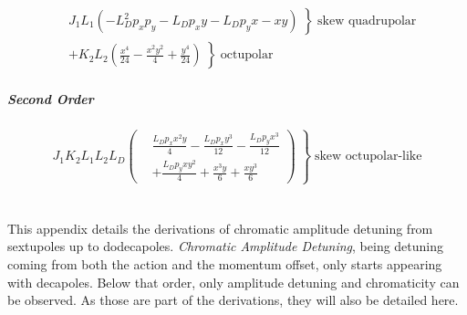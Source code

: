 \begin{equation}
  \begin{aligned}
    &\left. J_{1} L_{1} \left(- L_{D}^{2} p_{x} p_{y} - L_{D} p_{x} y - L_{D} p_{y} x - x y\right) \; \right\} \; \text{skew quadrupolar}\\
    &\left. + K_{2} L_{2} \left(\frac{x^{4}}{24} - \frac{x^{2} y^{2}}{4} + \frac{y^{4}}{24}\right) \; \right\} \; \text{octupolar}
  \end{aligned}
\end{equation}


\paragraph{Second Order}

\begin{equation}
  \left. J_{1} K_{2} L_{1} L_{2} L_{D} \left(
  \begin{aligned}
      &\frac{L_{D} p_{x} x^{2} y}{4} - \frac{L_{D} p_{x} y^{3}}{12} - \frac{L_{D} p_{y} x^{3}}{12} \\
      &+ \frac{L_{D} p_{y} x y^{2}}{4} + \frac{x^{3} y}{6} + \frac{x y^{3}}{6}
  \end{aligned}
  \right) \; \right\} \; \text{skew octupolar-like}
\end{equation}




\chapter{}
\label{appendix:chromatic_amplitude_detuning}
\thumbforappendix

This appendix details the derivations of chromatic amplitude detuning from sextupoles up to
dodecapoles. 
\textit{Chromatic Amplitude Detuning}, being detuning coming from both the action and the momentum
offset, only starts appearing with decapoles. Below that order, only amplitude detuning and
chromaticity can be observed. As those are part of the derivations, they will also be detailed here.


\section{}

